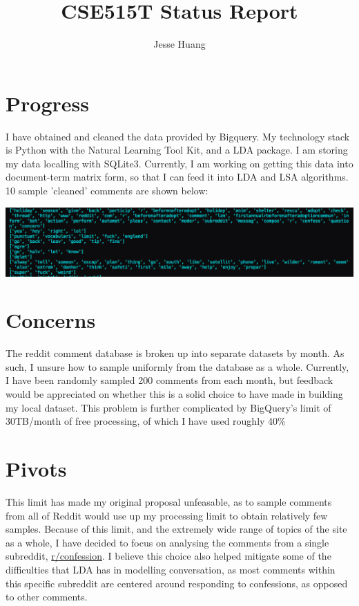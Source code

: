 \documentclass[12pt]{article}
\title{CSE515T Status Report}
\author{Jesse Huang}
\begin{document}
\maketitle
\section{Progress}
I have obtained and cleaned the data provided by Bigquery.
My technology stack is Python with the Natural Learning Tool Kit,
and a LDA package. I am storing my data localling with SQLite3.  
Currently, I am working on getting this data into document-term matrix
form, so that I can feed it into LDA and LSA algorithms. 10 sample
'cleaned' comments are shown below:
\begin{center}
\includegraphics[scale=0.3]{sample-clean-data.png}\\
\end{center}
\section{Concerns}
The reddit comment database is broken up into separate datasets
by month. As such, I unsure how to sample uniformly from the
database as a whole. Currently, I have been randomly sampled 200
comments from each month, but feedback would be appreciated on
whether this is a solid choice to have made in building my local
dataset. This problem is further complicated by BigQuery's limit of 30TB/month 
of free processing, of which I have used roughly 40\%
\section{Pivots}
This limit has made my original proposal unfeasable, as to sample
comments from all of Reddit would use up my processing limit to obtain
relatively few samples.
Because of this limit, and the extremely wide range of topics
of the site as a whole, I have decided to focus on analysing the comments
from a single subreddit,
\href{https://www.reddit.com/r/confession/}{r/confession}. 
I believe this choice also helped mitigate some of the difficulties that
LDA has in modelling conversation, as most comments within
this specific subreddit are centered around responding to
confessions, as opposed to other comments. 
\end{document}
